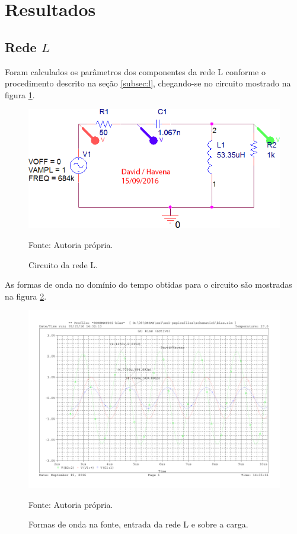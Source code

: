 \newpage
\section{Resultados}

\subsection{Rede $L$}

Foram calculados os parâmetros dos componentes da rede L conforme o procedimento descrito na seção \ref{subsec:l}, chegando-se no circuito mostrado na figura \ref{f_sch_rede_L}.

\begin{figure}[H]
    \centering
    \caption{Circuito da rede L.}
    \includegraphics[scale=0.5]{Imagens/ex1/sch.png}
    \label{f_sch_rede_L}
    
    \small Fonte: Autoria própria.
\end{figure}

As formas de onda no domínio do tempo obtidas para o circuito são mostradas na figura \ref{fig:ondas}.

\begin{figure}[H]
    \centering
    \caption{Formas de onda na fonte, entrada da rede L e sobre a carga.}
    \includegraphics[scale=0.5]{Imagens/ex1/ondas.pdf}
    \label{fig:ondas}
    
    \small Fonte: Autoria própria.
\end{figure}

